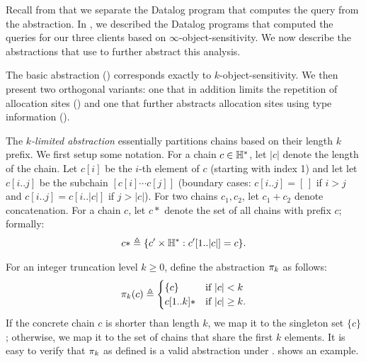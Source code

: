 
Recall from  that we separate the Datalog program that
computes the query from the abstraction.  In , we described
the Datalog programs that computed the queries for our three clients based on
$\infty$-object-sensitivity.  We now describe the abstractions that use to
further abstract this analysis.

The basic abstraction () corresponds exactly to
$k$-object-sensitivity.  We then present two orthogonal variants: one that in
addition limits the repetition of allocation sites ()
and one that further abstracts allocation sites using type information
().


The {\em $k$-limited abstraction}
essentially partitions chains based on their length $k$ prefix.
We first setup some notation.
For a chain $c \in {\mathbb H}^*$, let $|c|$ denote the length of the chain.
Let $c[i]$ be the $i$-th element of $c$ (starting with index 1) and let
let $c[i..j]$ be the subchain $[c[i] \cdots c[j]]$
(boundary cases: $c[i..j] = [\,]$ if $i > j$ and $c[i..j] = c[i..|c|]$ if $j > |c|$).
For two chains $c_1, c_2$, let $c_1+c_2$ denote concatenation.
For a chain $c$, let $c*$ denote the set of all chains
with prefix $c$; formally:
\begin{align}
c* \triangleq \{ c' \times {\mathbb H}^* : c'[1..|c|] = c \}.
\end{align}

For an integer truncation level $k \ge 0$, define the abstraction $\pi_k$ as follows:
\begin{align}
\label{eqn:klimitedAbstraction}
\pi_k(c) \triangleq
\begin{cases}
\{c\}     & \text{if $|c| < k$} \\
c[1..k]*  & \text{if $|c| \ge k$}. \\
\end{cases}
\end{align}
If the concrete chain $c$ is shorter than length $k$,
we map it to the singleton set $\{ c \}$;
otherwise, we map it to the set of chains that share the first $k$ elements.
It is easy to verify that $\pi_k$ as defined is a valid abstraction under .
 shows an example.

